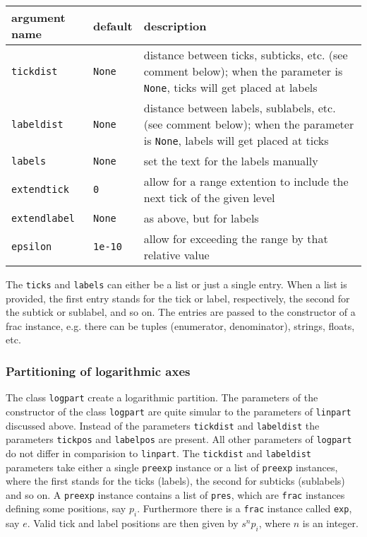\medskip
\begin{tabularx}{\linewidth}{ll>{\raggedright\arraybackslash}X}
argument name&default&description\\
\hline
\texttt{tickdist}&\texttt{None}&distance between ticks, subticks, etc. (see comment below); when the parameter is \texttt{None}, ticks will get placed at labels\\
\texttt{labeldist}&\texttt{None}&distance between labels, sublabels, etc. (see comment below); when the parameter is \texttt{None}, labels will get placed at ticks\\
\texttt{labels}&\texttt{None}&set the text for the labels manually\\
\texttt{extendtick}&\texttt{0}&allow for a range extention to include the next tick of the given level\\
\texttt{extendlabel}&\texttt{None}&as above, but for labels\\
\texttt{epsilon}&\texttt{1e-10}&allow for exceeding the range by that relative value\\
\end{tabularx}
\medskip

The \verb|ticks| and \verb|labels| can either be a list or just a
single entry. When a list is provided, the first entry stands for
the tick or label, respectively, the second for the subtick or
sublabel, and so on. The entries are passed to the constructor of a
frac instance, e.g. there can be tuples (enumerator, denominator),
strings, floats, etc.

\subsubsection{Partitioning of logarithmic axes}

The class \verb|logpart| create a logarithmic partition. The
parameters of the constructor of the class \verb|logpart| are quite
simular to the parameters of \verb|linpart| discussed above. Instead
of the parameters \verb|tickdist| and \verb|labeldist| the parameters
\verb|tickpos| and \verb|labelpos| are present. All other parameters
of \verb|logpart| do not differ in comparision to \verb|linpart|. The
\verb|tickdist| and \verb|labeldist| parameters take either a single
\verb|preexp| instance or a list of \verb|preexp| instances, where the
first stands for the ticks (labels), the second for subticks
(sublabels) and so on. A \verb|preexp| instance contains a list of
\verb|pres|, which are \verb|frac| instances defining some positions,
say $p_i$. Furthermore there is a \verb|frac| instance called
\verb|exp|, say $e$. Valid tick and label positions are then given by
$s^np_i$, where $n$ is an integer.

